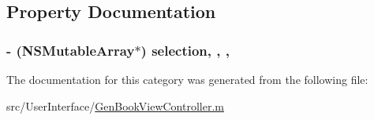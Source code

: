 \subsection{Property Documentation}
\hypertarget{category_gen_book_view_controller_07_08_aa72b3a5a83d00a2e0730daf4cda357ee}{
\subsubsection[{selection}]{\setlength{\rightskip}{0pt plus 5cm}-\/ (N\-S\-Mutable\-Array$\ast$) selection\hspace{0.3cm}{\ttfamily [read]}, {\ttfamily [write]}, {\ttfamily [atomic]}, {\ttfamily [retain]}}}\label{category_gen_book_view_controller_07_08_aa72b3a5a83d00a2e0730daf4cda357ee}


The documentation for this category was generated from the following file\-:\begin{DoxyCompactItemize}
\item 
src/\-User\-Interface/\hyperlink{_gen_book_view_controller_8m}{Gen\-Book\-View\-Controller.\-m}\end{DoxyCompactItemize}
